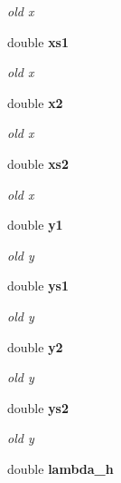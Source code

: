 \begin{CompactItemize}
\begin{CompactList}\small\item\em old x\item\end{CompactList}\item 
double {\bf xs1}\label{structParticle_m7}

\begin{CompactList}\small\item\em old x\item\end{CompactList}\item 
double {\bf x2}\label{structParticle_m8}

\begin{CompactList}\small\item\em old x\item\end{CompactList}\item 
double {\bf xs2}\label{structParticle_m9}

\begin{CompactList}\small\item\em old x\item\end{CompactList}\item 
double {\bf y1}\label{structParticle_m10}

\begin{CompactList}\small\item\em old y\item\end{CompactList}\item 
double {\bf ys1}\label{structParticle_m11}

\begin{CompactList}\small\item\em old y\item\end{CompactList}\item 
double {\bf y2}\label{structParticle_m12}

\begin{CompactList}\small\item\em old y\item\end{CompactList}\item 
double {\bf ys2}\label{structParticle_m13}

\begin{CompactList}\small\item\em old y\item\end{CompactList}\item 
double {\bf lambda\_\-h}\label{structParticle_m14}


\end{CompactItemize}
